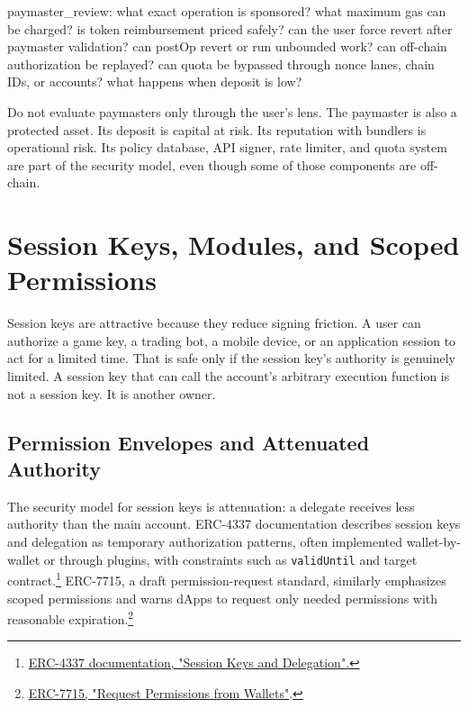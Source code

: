 \begin{codeblock}
paymaster_review:
    what exact operation is sponsored?
    what maximum gas can be charged?
    is token reimbursement priced safely?
    can the user force revert after paymaster validation?
    can postOp revert or run unbounded work?
    can off-chain authorization be replayed?
    can quota be bypassed through nonce lanes, chain IDs, or accounts?
    what happens when deposit is low?
\end{codeblock}

Do not evaluate paymasters only through the user's lens. The paymaster is also a protected asset. Its deposit is capital at risk. Its reputation with bundlers is operational risk. Its policy database, API signer, rate limiter, and quota system are part of the security model, even though some of those components are off-chain.

\section{Session Keys, Modules, and Scoped Permissions}

Session keys are attractive because they reduce signing friction. A user can authorize a game key, a trading bot, a mobile device, or an application session to act for a limited time. That is safe only if the session key's authority is genuinely limited. A session key that can call the account's arbitrary execution function is not a session key. It is another owner.

\subsection{Permission Envelopes and Attenuated Authority}

The security model for session keys is attenuation: a delegate receives less authority than the main account. ERC-4337 documentation describes session keys and delegation as temporary authorization patterns, often implemented wallet-by-wallet or through plugins, with constraints such as \texttt{validUntil} and target contract.\footnote{\href{https://docs.erc4337.io/smart-accounts/session-keys-and-delegation.html}{ERC-4337 documentation, "Session Keys and Delegation".}} ERC-7715, a draft permission-request standard, similarly emphasizes scoped permissions and warns dApps to request only needed permissions with reasonable expiration.\footnote{\href{https://eips.ethereum.org/EIPS/eip-7715}{ERC-7715, "Request Permissions from Wallets"}.}

